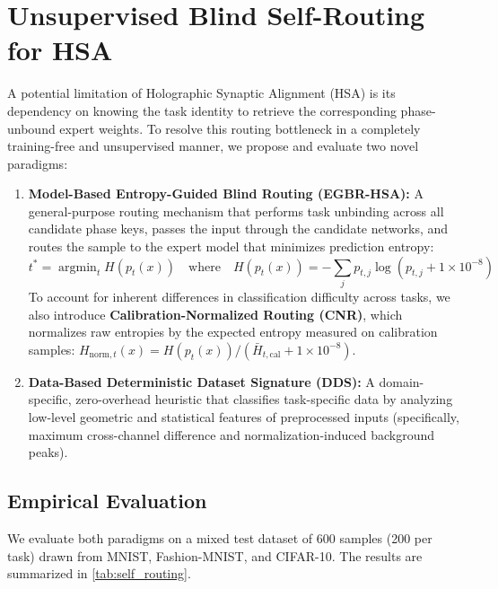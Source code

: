 \documentclass{article}
\theoremstyle{plain}
\theoremstyle{definition}
\theoremstyle{remark}
\begin{document}
\section{Unsupervised Blind Self-Routing for HSA}
\label{sec:self_routing}
A potential limitation of Holographic Synaptic Alignment (HSA) is its dependency on knowing the task identity to retrieve the corresponding phase-unbound expert weights. To resolve this routing bottleneck in a completely training-free and unsupervised manner, we propose and evaluate two novel paradigms:
\begin{enumerate}
    \item \textbf{Model-Based Entropy-Guided Blind Routing (EGBR-HSA):} A general-purpose routing mechanism that performs task unbinding across all candidate phase keys, passes the input through the candidate networks, and routes the sample to the expert model that minimizes prediction entropy:
    \begin{equation}
        t^* = \operatorname{argmin}_{t} H(p_t(x)) \quad \text{where} \quad H(p_t(x)) = -\sum_{j} p_{t,j} \log(p_{t,j} + 1\times 10^{-8})
    \end{equation}
    To account for inherent differences in classification difficulty across tasks, we also introduce \textbf{Calibration-Normalized Routing (CNR)}, which normalizes raw entropies by the expected entropy measured on calibration samples: $H_{\text{norm}, t}(x) = H(p_t(x)) / (\bar{H}_{t,\text{cal}} + 1\times 10^{-8})$.
    \item \textbf{Data-Based Deterministic Dataset Signature (DDS):} A domain-specific, zero-overhead heuristic that classifies task-specific data by analyzing low-level geometric and statistical features of preprocessed inputs (specifically, maximum cross-channel difference and normalization-induced background peaks).
\end{enumerate}

\subsection{Empirical Evaluation}
We evaluate both paradigms on a mixed test dataset of 600 samples (200 per task) drawn from MNIST, Fashion-MNIST, and CIFAR-10. The results are summarized in \cref{tab:self_routing}.
\end{document}
